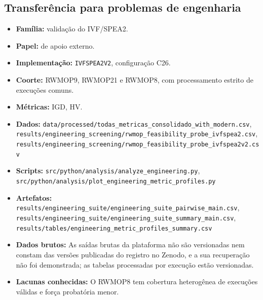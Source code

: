 \subsection*{Transferência para problemas de engenharia}
\begin{itemize}[nosep]\raggedright
    \item \textbf{Família:} validação do IVF/SPEA2.
    \item \textbf{Papel:} de apoio externo.
    \item \textbf{Implementação:} \texttt{IVFSPEA2V2}, configuração C26.
    \item \textbf{Coorte:} RWMOP9, RWMOP21 e RWMOP8, com processamento estrito de execuções comuns.
    \item \textbf{Métricas:} IGD, HV.
    \item \textbf{Dados:} \texttt{data/\allowbreak{}processed/\allowbreak{}todas\_\allowbreak{}metricas\_\allowbreak{}consolidado\_\allowbreak{}with\_\allowbreak{}modern.csv}, \texttt{results/\allowbreak{}engineering\_\allowbreak{}screening/\allowbreak{}rwmop\_\allowbreak{}feasibility\_\allowbreak{}probe\_\allowbreak{}ivfspea2.csv}, \texttt{results/\allowbreak{}engineering\_\allowbreak{}screening/\allowbreak{}rwmop\_\allowbreak{}feasibility\_\allowbreak{}probe\_\allowbreak{}ivfspea2v2.csv}
    \item \textbf{Scripts:} \texttt{src/\allowbreak{}python/\allowbreak{}analysis/\allowbreak{}analyze\_\allowbreak{}engineering.py}, \texttt{src/\allowbreak{}python/\allowbreak{}analysis/\allowbreak{}plot\_\allowbreak{}engineering\_\allowbreak{}metric\_\allowbreak{}profiles.py}
    \item \textbf{Artefatos:} \texttt{results/\allowbreak{}engineering\_\allowbreak{}suite/\allowbreak{}engineering\_\allowbreak{}suite\_\allowbreak{}pairwise\_\allowbreak{}main.csv}, \texttt{results/\allowbreak{}engineering\_\allowbreak{}suite/\allowbreak{}engineering\_\allowbreak{}suite\_\allowbreak{}summary\_\allowbreak{}main.csv}, \texttt{results/\allowbreak{}tables/\allowbreak{}engineering\_\allowbreak{}metric\_\allowbreak{}profiles\_\allowbreak{}summary.csv}
    \item \textbf{Dados brutos:} As saídas brutas da plataforma não são versionadas nem constam das versões publicadas do registro no Zenodo, e a sua recuperação não foi demonstrada; as tabelas processadas por execução estão versionadas.
    \item \textbf{Lacunas conhecidas:} O RWMOP8 tem cobertura heterogênea de execuções válidas e força probatória menor.
\end{itemize}

